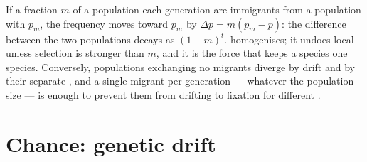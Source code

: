 \begin{proposition}\label{prop:b2:population-genetics:migration}
If a fraction $m$ of a population each generation are immigrants
from a population with  $p_{m}$, the frequency
moves toward $p_{m}$ by $\Delta p = m(p_{m} - p)$: the difference
between the two populations decays as $(1 - m)^{t}$. \emph{} homogenises; it undoes local  unless selection is
stronger than $m$, and it is the force that keeps a species one
species. Conversely, populations exchanging no migrants diverge by
drift and by their separate , and a single migrant per
generation --- whatever the population size --- is enough to prevent
them from drifting to fixation for different .
\end{proposition}

\section{Chance: genetic drift}

